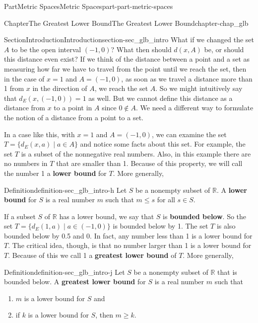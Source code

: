 \documentclass[oneside,10pt,]{book}
\newcommand{\terminology}[1]{\textbf{#1}}
\numberwithin{equation}{chapter}
\newcommand{\R}{\mathbb{R}}
\begin{document}
\begin{partptx}{Part}{Metric Spaces}{}{Metric Spaces}{}{}{part-part-metric-spaces}
\begin{chapterptx}{Chapter}{The Greatest Lower Bound}{}{The Greatest Lower Bound}{}{}{chapter-chap_glb}
\begin{sectionptx}{Section}{Introduction}{}{Introduction}{}{}{section-sec_glb_intro}
What if we changed the set \(A\) to be the open interval \((-1,0)\)? What then should \(d(x,A)\) be, or should this distance even exist? If we think of the distance between a point and a set as measuring how far we have to travel from the point until we reach the set, then in the case of \(x=1\) and \(A=(-1,0)\), as soon as we travel a distance more than 1 from \(x\) in the direction of \(A\), we reach the set \(A\). So we might intuitively say that \(d_E(x,(-1,0)) = 1\) as well. But we cannot define this distance as a distance from \(x\) to a point in \(A\) since \(0 \notin A\). We need a different way to formulate the notion of a distance from a point to a set.%
\par
In a case like this, with \(x=1\) and \(A = (-1,0)\), we can examine the set \(T=\{d_E(x,a) \mid a \in A\}\) and notice some facts about this set. For example, the set \(T\) is a subset of the nonnegative real numbers. Also, in this example there are no numbers in \(T\) that are smaller than 1. Because of this property, we will call the number 1 a \terminology{lower bound} for \(T\). More generally,%
\begin{definition}{Definition}{}{definition-sec_glb_intro-h}%
%
Let \(S\) be a nonempty subset of \(\R\). A \terminology{lower bound} for \(S\) is a real number \(m\) such that \(m \leq s\) for all \(s \in S\).%
\end{definition}
If a subset \(S\) of \(\R\) has a lower bound, we say that \(S\) is \terminology{bounded below}. So the set \(T = \{d_E(1,a) \mid a \in (-1,0)\}\) is bounded below by 1. The set \(T\) is also bounded below by 0.5 and 0. In fact, any number less than 1 is a lower bound for \(T\). The critical idea, though, is that no number larger than 1 is a lower bound for \(T\). Because of this we call 1 a \terminology{greatest lower bound} of \(T\). More generally,%
\begin{definition}{Definition}{}{definition-sec_glb_intro-j}%
%
Let \(S\) be a nonempty subset of \(\R\) that is bounded below. A \terminology{greatest lower bound} for \(S\) is a real number \(m\) such that%
\begin{enumerate}
\item{}\(m\) is a lower bound for \(S\) and%
\item{}if \(k\) is a lower bound for \(S\), then \(m \geq k\).%
\end{enumerate}
%
\end{definition}

\end{sectionptx}
\end{chapterptx}
\end{partptx}
\end{document}
